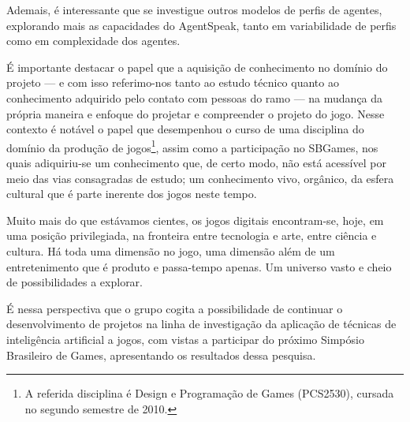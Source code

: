 Ademais, é interessante que se investigue outros modelos de perfis de agentes, explorando mais as capacidades do AgentSpeak, tanto em variabilidade de perfis como em complexidade dos agentes.



É importante destacar o papel que a aquisição de conhecimento no
domínio do projeto --- e com isso referimo-nos tanto ao estudo técnico
quanto ao conhecimento adquirido pelo contato com pessoas do ramo ---
na mudança da própria maneira e enfoque do projetar e compreender o
projeto do jogo. Nesse contexto é notável o papel que desempenhou o
curso de uma disciplina do domínio da produção de
jogos\footnote{A referida disciplina é Design e Programação de Games
 (\textsc{PCS2530}), cursada no segundo semestre de 2010.}, assim
como a participação no SBGames, nos quais adiquiriu-se um conhecimento
que, de certo modo, não está acessível por meio das vias consagradas
de estudo; um conhecimento vivo, orgânico, da esfera cultural que é
parte inerente dos jogos neste tempo.

Muito mais do que estávamos cientes, os jogos digitais encontram-se, hoje, em uma posição
privilegiada, na fronteira entre tecnologia e arte, entre ciência e
cultura. Há toda uma dimensão no jogo, uma dimensão além de um
entretenimento que é produto e passa-tempo apenas. Um universo vasto e cheio de possibilidades a explorar.

É nessa perspectiva que o grupo cogita a possibilidade de continuar o desenvolvimento de projetos na linha de investigação da aplicação de técnicas de inteligência artificial a jogos, com vistas a participar do próximo Simpósio Brasileiro de Games, apresentando os resultados dessa pesquisa.
